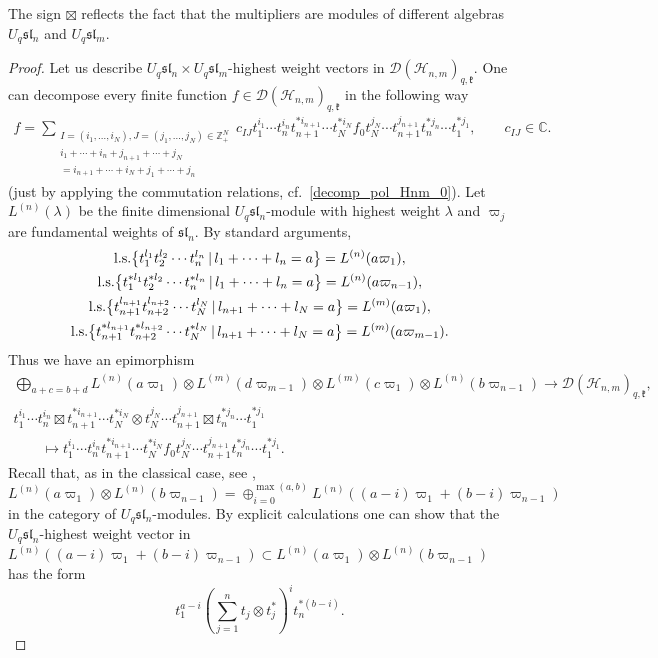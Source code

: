 \begin{remark}
The sign $\boxtimes$ ref\/lects the fact that the multipliers are modules of dif\/ferent algebras $U_q
\mathfrak{sl}_n$ and $U_q \mathfrak{sl}_m$.
\end{remark}

\begin{proof} Let us describe $U_q \mathfrak{sl}_n \times U_q \mathfrak{sl}_m$-highest weight vectors in
$\mathscr{D}(\mathscr{H}_{n,m})_{q,\mathfrak{k}}$. One can decompose every f\/inite function $f \in
\mathscr{D}(\mathscr{H}_{n,m})_{q,\mathfrak{k}}$ in the following way
\begin{gather*}
f= \sum_{\substack{I=(i_1,\ldots,i_N), J=(j_1,\ldots,j_N) \in \mathbb Z_+^N \\ i_1+\cdots +
i_n+j_{n+1}+\cdots +j_N\\ = i_{n+1}+\cdots+i_N+j_1+\cdots +j_n}} \!\!\!\!\!c_{IJ}t_1^{i_1}\cdots
t_n^{i_n}t_{n+1}^{*i_{n+1}}\cdots t_N^{*i_N}f_0t_N^{j_N}\cdots t_{n+1}^{j_{n+1}}t_n^{*j_n}\cdots t_1^{*j_1},
\qquad c_{IJ} \in \mathbb C.
\end{gather*}
(just by applying the commutation relations, cf.~\eqref{decomp_pol_Hnm_0}). Let $L^{(n)}(\lambda)$ be the
f\/inite dimensional $U_q \mathfrak{sl}_n$-module with highest weight $\lambda$ and $\varpi_j$ are fundamental
weights of $\mathfrak{sl}_n$. By standard arguments,
\begin{gather*}
 {\rm l.s.}\big\{t_1^{l_1}t_2^{l_2}\cdots t_n^{l_n}\,|\,l_1+\cdots+l_n=a\big\}=L^{(n)}(a\varpi_1),
\\  {\rm l.s.}\big\{t_1^{*l_1}t_2^{*l_2}\cdots t_n^{*l_n}\,|\,l_1+\cdots+l_n=a\big\}=L^{(n)}(a\varpi_{n-1}),
\\  {\rm l.s.}\big\{t_{n+1}^{l_{n+1}}t_{n+2}^{l_{n+2}}\cdots t_N^{l_N}\,|\, l_{n+1}+\cdots+l_N=a\big\}=L^{(m)}(a\varpi_1),
\\  {\rm l.s.}\big\{t_{n+1}^{*l_{n+1}}t_{n+2}^{*l_{n+2}}\cdots
t_N^{*l_N}\,|\,l_{n+1}+\cdots+l_N=a\big\}=L^{(m)}(a\varpi_{m-1}).
\end{gather*}
Thus we have an epimorphism
\begin{gather*}
\bigoplus_{a+c=b+d} L^{(n)}(a\varpi_1) \otimes  L^{(m)}(d\varpi_{m-1}) \otimes L^{(m)}(c\varpi_1) \otimes
L^{(n)}(b\varpi_{n-1}) \rightarrow \mathscr{D}(\mathscr{H}_{n,m})_{q,\mathfrak{k}},
\\
t_1^{i_1}\cdots t_n^{i_n} \boxtimes t_{n+1}^{*i_{n+1}}\cdots t_N^{*i_N} \otimes t_N^{j_N}\cdots
t_{n+1}^{j_{n+1}} \boxtimes t_n^{*j_n}\cdots t_1^{*j_1}\\
\qquad{} \mapsto t_1^{i_1}\cdots t_n^{i_n}
t_{n+1}^{*i_{n+1}}\cdots t_N^{*i_N}f_0t_N^{j_N}\cdots t_{n+1}^{j_{n+1}}t_n^{*j_n}\cdots t_1^{*j_1}.
\end{gather*}
Recall that, as in the classical case, see \cite{VO},
\[
L^{(n)}(a\varpi_1) \otimes L^{(n)}(b\varpi_{n-1}) = \oplus_{i=0}^{\max(a,b)}
L^{(n)}((a-i)\varpi_1+(b-i)\varpi_{n-1})
\]
in the category of $U_q \mathfrak{sl}_n$-modules. By explicit calculations one can show that the $U_q
\mathfrak{sl}_n$-highest weight vector in $L^{(n)}((a-i)\varpi_1+(b-i)\varpi_{n-1}) \subset
L^{(n)}(a\varpi_1) \otimes L^{(n)}(b\varpi_{n-1})$ has the form
\[
t_1^{a-i}  \left(\sum_{j=1}^nt_j
\otimes t_j^*\right)^{i}   t_n^{*(b-i)}.
\]


\end{proof}
